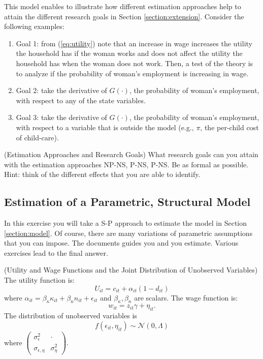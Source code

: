 \indent This model enables to illustrate how different estimation approaches help to attain the different research goals in Section \ref{section:extension}. Consider the following examples:
\begin{enumerate}
\item Goal 1: from (\ref{eq:utility}) note that an increase in wage increases the utility the household has if the woman works and does not affect the utility the household has when the woman does not work. Then, a test of the theory is to analyze if the probability of woman's employment is increasing in wage. 
\item Goal 2: take the derivative of $G(\cdot)$, the probability of woman's employment, with respect to any of the state variables.
\item Goal 3: take the derivative of $G(\cdot)$, the probability of woman's employment, with respect to a variable that is outside the model (e.g., $\pi$, the per-child cost of child-care). 
\end{enumerate}

\begin{exercise} (Estimation Approaches and Research Goals) \label{exercise:approaches}
What research goals can you attain with the estimation approaches NP-NS, P-NS, P-NS. Be as formal as possible. Hint: think of the different effects that you are able to identify.
\end{exercise}

\subsection{Estimation of a Parametric, Structural Model}
In this exercise you will take a S-P approach to estimate the model in Section \ref{section:model}. Of course, there are many variations of parametric assumptions that you can impose. The documents guides you and you estimate. Various exercises lead to the final answer. 

\begin{assumption} (Utility and Wage Functions and the Joint Distribution of Unobserved Variables) \label{assumption:utwajo}
The utility function is:
\begin{equation}
U_{it} = c_{it} + \alpha_{it} (1 - d_{it})
\end{equation}
\noindent where $\alpha_{it} = \beta_{\kappa} \kappa_{it} + \beta_{n} n_{it} + \epsilon_{it}$ and $\beta_{\kappa},\beta_{n}$ are scalars. The wage function is:
\begin{equation}
w_{it} = z_{it} \gamma + \eta_{it}.
\end{equation}
\noindent The distribution of unobserved variables is
\begin{equation}
f \left( \epsilon_{it}, \eta_{it} \right) \sim \mathcal{N} \left( 0, \Lambda \right)
\end{equation}
where $\left( \begin{array}{cc} 
\sigma_{\epsilon}^2 & \cdot \\
\sigma_{\epsilon, \eta} & \sigma_{\eta}^2
\end{array} \right)$.  
\end{assumption}


